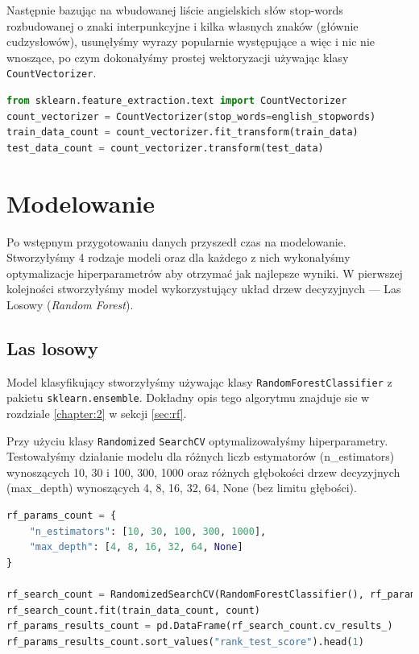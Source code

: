 \noindent Następnie bazując na wbudowanej liście angielskich słów stop-words rozbudowanej o znaki interpunkcyjne i kilka własnych znaków (głównie cudzysłowów), usunęłyśmy wyrazy popularnie występujące a więc i nic nie wnoszące, po czym dokonałyśmy prostej wektoryzacji używając klasy \verb|CountVectorizer|.

\begin{lstlisting}[language=Python,frame=single, breaklines=true, caption=Wektoryzacja zbiorów danych --- treningowego i testowego.,label=code:vectorization]
from sklearn.feature_extraction.text import CountVectorizer
count_vectorizer = CountVectorizer(stop_words=english_stopwords) 
train_data_count = count_vectorizer.fit_transform(train_data)
test_data_count = count_vectorizer.transform(test_data)
\end{lstlisting}



\section{Modelowanie}
Po wstępnym przygotowaniu danych przyszedł czas na modelowanie. Stworzyłyśmy 4 rodzaje modeli oraz dla każdego z nich wykonałyśmy optymalizacje hiperparametrów aby otrzymać jak najlepsze wyniki. W pierwszej kolejności stworzyłyśmy model wykorzystujący układ drzew decyzyjnych --- Las Losowy (\textit{Random Forest}).

\subsection{Las losowy}

Model klasyfikujący stworzyłyśmy używając klasy \verb|RandomForestClassifier| z pakietu \verb|sklearn.ensemble|. Dokładny opis tego algorytmu znajduje sie w rozdziale \ref{chapter:2} w sekcji \ref{sec:rf}.

\noindent Przy użyciu klasy \verb|Randomized| \verb|SearchCV| optymalizowałyśmy hiperparametry. Testowałyśmy działanie modelu dla różnych liczb estymatorów (n\_estimators)  wynoszących 10, 30 i 100, 300, 1000 oraz różnych głębokości drzew decyzyjnych (max\_depth) wynoszących 4, 8, 16, 32, 64, None (bez limitu głębości).

\begin{lstlisting}[language=Python,frame=single, breaklines=true, caption=Optymalizacja hiperparametrów RF (RandomizedSearchCV).,label=code:rf-hiper]
rf_params_count = {
	"n_estimators": [10, 30, 100, 300, 1000],
	"max_depth": [4, 8, 16, 32, 64, None]
}

rf_search_count = RandomizedSearchCV(RandomForestClassifier(), rf_params_count,refit= True, verbose= 3)
rf_search_count.fit(train_data_count, count)
rf_params_results_count = pd.DataFrame(rf_search_count.cv_results_)
rf_params_results_count.sort_values("rank_test_score").head(1)
\end{lstlisting}


